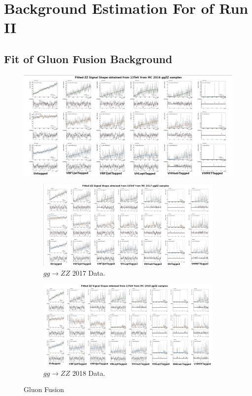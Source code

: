 \label{appendix:be}
\section{Background Estimation For of Run II}
\subsection{Fit of Gluon Fusion Background}

\begin{figure}[h]
    \centering
    \includegraphics[scale=0.6]{images/2016gg.jpg}\\
     \vspace*{-15mm}
\end{figure}

\begin{figure}[h]
 \vspace*{-15mm}
 \centering
\begin{subfigure}[b]{0.8\textwidth}
    \includegraphics[scale=0.6]{images/2017gg.jpg}
    \caption{$gg \rightarrow ZZ$ 2017 Data.}
\end{subfigure}
\vfill
\begin{subfigure}[b]{0.8\textwidth}
    \includegraphics[scale=0.6]{images/2018gg.jpg}
    \caption{$gg \rightarrow ZZ$ 2018 Data.}
\end{subfigure}
\caption{Gluon Fusion}
\end{figure}
\clearpage
